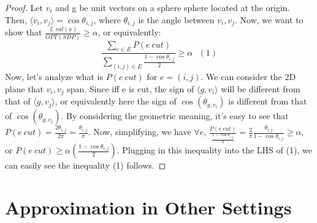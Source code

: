 \documentclass[11pt]{article}
\newcommand{\<}{\langle}
\renewcommand{\>}{\rangle}
\theoremstyle{definition}
\numberwithin{problem}{section}
\DeclareMathOperator*{\E}{\mathbb{E}}
\begin{document}
\begin{proof}
Let $v_i$ and g be unit vectors on a sphere sphere located at the origin. Then, $\<v_i, v_j\> = \cos\theta_{i,j}$, where $\theta_{i,j}$ is the angle between $v_i, v_j$. Now, we want to show that $\frac{\E val(x)}{OPT(SDP)} \geq \alpha$, or equivalently: \[\frac{\sum_{e \in E} P(e\ cut)}{\sum_{(i,j)\in E}\frac{1-\cos \theta_{i,j}}{2}} \geq \alpha\ \ \ (1)\] 
Now, let's analyze what is $P(e\ cut)$ for $e = (i, j)$. We can consider the 2D plane that $v_i, v_j$ span. Since iff e is cut, the sign of $\<g, v_i\>$ will be different from that of $\<g, v_j\>$, or equivalently here the sign of $\cos(\theta_{g, v_i})$ is different from that of $\cos(\theta_{g, v_j})$. By considering the geometric meaning, it's easy to see that $P(e\ cut) = \frac{2\theta_{i,j}}{2\pi} = \frac{\theta_{i,j}}{\pi}$. Now, simplifying, we have $\forall e$, $\frac{P(e\ cut)}{\frac{1 - \cos \theta_{i,j}}{2}} = \frac{2}{\pi} \frac{\theta_{i,j}}{1 - \cos \theta_{i,j}} \geq \alpha$, or $P(e\ cut) \geq \alpha (\frac{1 - \cos \theta_{i,j}}{2})$. Plugging in this inequality into the LHS of (1), we can easily see the inequality (1) follows.
\end{proof}
\section{Approximation in Other Settings}
\end{document}

